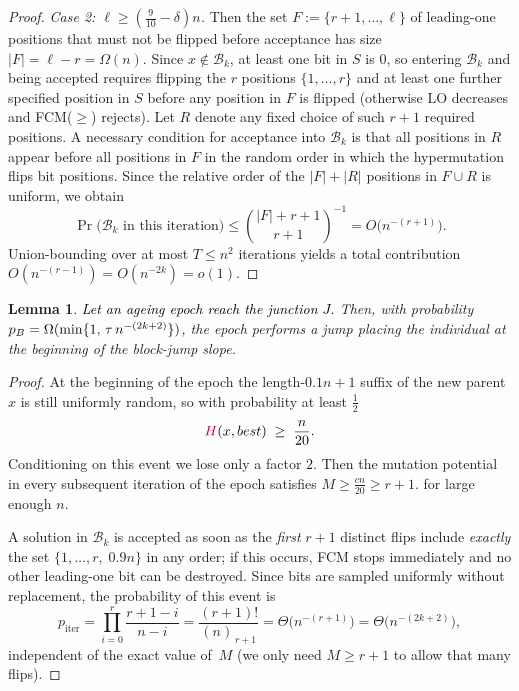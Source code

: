 \documentclass[lettersize,journal]{IEEEtran}
\newcommand{\new}[1]{\textcolor{black}{#1}}
\newcommand{\rerev}[1]{\textcolor{purple}{#1}}
\newtheorem{lemma}{Lemma}
\begin{document}
{\begin{proof}
	\emph{Case 2: $\ell \ge (\tfrac{9}{10}-\delta)n$.}
	Then the set
	$F:=\{r{+}1,\dots,\ell\}$ of leading-one positions that must not be flipped before
	acceptance has size $|F|=\ell-r=\Omega(n)$.  Since $x\notin\mathcal{B}_k$, at
	least one bit in $S$ is $0$, so entering $\mathcal{B}_k$ and being accepted
	requires flipping the $r$ positions $\{1,\dots,r\}$ and at least one further
	specified position in $S$ before any position in $F$ is flipped (otherwise
	$\mathrm{LO}$ decreases and FCM($\ge$) rejects).  Let $R$ denote any fixed choice
	of such $r{+}1$ required positions.  A necessary condition for acceptance into
	$\mathcal{B}_k$ is that all positions in $R$ appear before all positions in $F$ in
	the random order in which the hypermutation flips bit positions.  Since the
	relative order of the $|F|+|R|$ positions in $F\cup R$ is uniform, we obtain
	\[
	\Pr\bigl(\mathcal{B}_k \text{ in this iteration}\bigr)
	\le
	\binom{|F|+r+1}{r+1}^{-1}
=
	O\!\bigl(n^{-(r+1)}\bigr).
	\]
	Union-bounding over at most $T\le n^2$ iterations yields a total contribution
	$O(n^{-(r-1)})=O(n^{-2k})=o(1)$.
	
\end{proof}


\setcounter{theorem}{12}
\begin{lemma} %
	\textcolor{black}{Let an ageing epoch reach the junction $J$.} Then, with probability $\new{p_B}=\Omega(\min\{1,\,\tau\,n^{-(2k+2)}\})$, the epoch performs a jump placing the individual at the beginning of the block-jump slope.
\end{lemma}


\begin{proof}
	At the beginning of the epoch the length-\(0.1n+1\) suffix of the new parent \(x\) is still uniformly random,
	so with probability at least \(\tfrac12\)
	\[
	\rerev{H}(x,best)\;\ge\;\frac{n}{20}.
	\]
	Conditioning on this event we lose only a factor \(2\).
	Then the mutation potential in every subsequent
	iteration of the epoch satisfies
	\(
	M\ge \tfrac{cn}{20}  \geq r+1.
	\) for large enough $n$.
	
A solution in $\mathcal{B}_k$ is accepted as soon as the \emph{first} $r{+}1$ distinct flips
	include \emph{exactly} the set
	\(\{1,\dots,r,\;0.9n\}\)
	in any order; if this occurs, FCM stops immediately and no other
	leading-one bit can be destroyed.
Since bits are sampled uniformly without replacement, the probability of
	this event is
	\[
	p_{\text{iter}}
	=\prod_{i=0}^{r}\frac{r+1-i}{n-i}
	=\frac{(r+1)!}{(n)_{\,r+1}}
	=\Theta\!\bigl(n^{-(r+1)}\bigr)
	=\Theta\!\bigl(n^{-(2k+2)}\bigr),
	\]
	independent of the exact value of~$M$ (we only need $M\ge r{+}1$ to allow that
	many flips).
	

\end{proof}}
\end{document}
